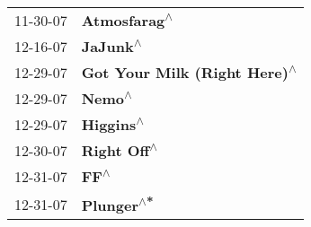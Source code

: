 \begin{supertabular}{p{0.25\columnwidth}p{0.75\columnwidth}}
 11-30-07 &                          \textbf{Atmosfarag\textsuperscript{$\wedge$}} \\
 12-16-07 &                              \textbf{JaJunk\textsuperscript{$\wedge$}} \\
 12-29-07 &          \textbf{Got Your Milk (Right Here)\textsuperscript{$\wedge$}} \\
 12-29-07 &                                \textbf{Nemo\textsuperscript{$\wedge$}} \\
 12-29-07 &                             \textbf{Higgins\textsuperscript{$\wedge$}} \\
 12-30-07 &                           \textbf{Right Off\textsuperscript{$\wedge$}} \\
 12-31-07 &                                  \textbf{FF\textsuperscript{$\wedge$}} \\
 12-31-07 &                            \textbf{Plunger\textsuperscript{$\wedge$*}} \\
\end{supertabular}

